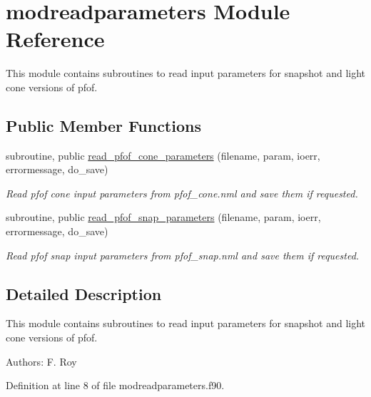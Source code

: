 \hypertarget{classmodreadparameters}{\section{modreadparameters Module Reference}
\label{classmodreadparameters}
}


This module contains subroutines to read input parameters for snapshot and light cone versions of pfof.  


\subsection*{Public Member Functions}
\begin{DoxyCompactItemize}
\item 
subroutine, public \hyperlink{classmodreadparameters_a033e83a3589d0fa82929dd9d27c23c81}{read\-\_\-pfof\-\_\-cone\-\_\-parameters} (filename, param, ioerr, errormessage, do\-\_\-save)
\begin{DoxyCompactList}\small\item\em Read pfof cone input parameters from pfof\-\_\-cone.\-nml and save them if requested. \end{DoxyCompactList}\item 
subroutine, public \hyperlink{classmodreadparameters_a0a463b7c2c07da9a6f49ebb7f9209277}{read\-\_\-pfof\-\_\-snap\-\_\-parameters} (filename, param, ioerr, errormessage, do\-\_\-save)
\begin{DoxyCompactList}\small\item\em Read pfof snap input parameters from pfof\-\_\-snap.\-nml and save them if requested. \end{DoxyCompactList}\end{DoxyCompactItemize}


\subsection{Detailed Description}
This module contains subroutines to read input parameters for snapshot and light cone versions of pfof. 

Authors\-: F. Roy 

Definition at line 8 of file modreadparameters.\-f90.



